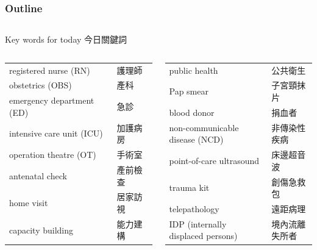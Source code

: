 \documentclass[aspectratio=169]{beamer}
\begin{document}
\begin{frame}
\frametitle{Outline}

\begin{columns}
\tableofcontents



\end{columns}


\end{frame}

\begin{frame}{Key words for today 今日關鍵詞}
\footnotesize
\begin{columns}[t]
\begin{tabular}{@{}ll@{}}
registered nurse (RN) & 護理師 \\
obstetrics (OBS) & 產科 \\
emergency department (ED) & 急診 \\
intensive care unit (ICU) & 加護病房 \\
operation theatre (OT) & 手術室 \\
antenatal check & 產前檢查 \\
home visit & 居家訪視 \\
capacity building & 能力建構 \\
\end{tabular}
\begin{tabular}{@{}ll@{}}
public health & 公共衛生 \\
Pap smear & 子宮頸抹片 \\
blood donor & 捐血者 \\
non-communicable disease (NCD) & 非傳染性疾病 \\
point-of-care ultrasound & 床邊超音波 \\
trauma kit & 創傷急救包 \\
telepathology & 遠距病理 \\
IDP (internally displaced persons) & 境內流離失所者 \\
\end{tabular}
\end{columns}
\end{frame}
\end{document}
